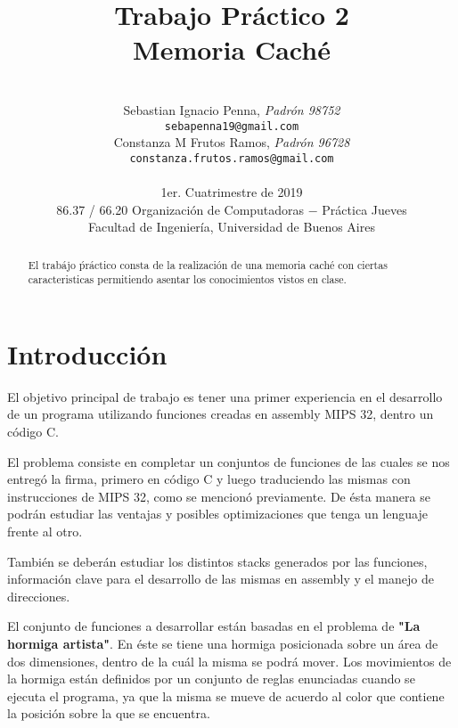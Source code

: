 \documentclass[a4paper, 10pt, twoside, notitlepage]{article}
\title{\textbf{Trabajo Práctico 2\\Memoria Caché} \\}
\author{ \\
         Sebastian Ignacio Penna, \textit{Padrón 98752} \\
          \texttt{ sebapenna19@gmail.com }       \\
		  [2.5ex]
         Constanza M Frutos Ramos, \textit{Padrón 96728}     \\
          \texttt{constanza.frutos.ramos@gmail.com}                      \\ 
		  [2.5ex]
		 \\
         \normalsize{1er. Cuatrimestre de 2019}            \\
         \normalsize{86.37 / 66.20 Organización de Computadoras $-$ Práctica Jueves} \\
         \normalsize{Facultad de Ingeniería, Universidad de Buenos Aires} 
       }
\date{}
\begin{document}
\maketitle


\begin{abstract}
El trabájo ṕráctico consta de la realización de una memoria caché con ciertas caracteristicas permitiendo asentar los conocimientos vistos en clase. 
\end{abstract}

% 
\newpage
% 

\pagestyle{fancy}
\fancyhead{}
\fancyfoot{}
\renewcommand{\sectionmark}[1]{\markright{\thesection\ #1}}
\renewcommand{\headrulewidth}{0.4pt}
\fancyhead[LE]{\nouppercase \rightmark}
\fancyhead[RE, LO]{\bf \thepage}
\fancyhead[RO]{\nouppercase \rightmark}
\fancyfoot[C]{ }
\maketitle
\setcounter{page}{1}
\tableofcontents
\newpage

\parskip 7.2pt
\section{Introducción}
El objetivo principal de trabajo es tener una primer experiencia en el desarrollo de un programa utilizando funciones creadas en assembly MIPS 32, dentro un código C.

El problema consiste en completar un conjuntos de funciones de las cuales se nos entregó la firma, primero en código C y luego traduciendo las mismas con instrucciones de MIPS 32, como se mencionó previamente. De ésta manera se podrán estudiar las ventajas y posibles optimizaciones que tenga un lenguaje frente al otro.

También se deberán estudiar los distintos stacks generados por las funciones, información clave para el desarrollo de las mismas en assembly y el manejo de direcciones.

El conjunto de funciones a desarrollar están basadas en el problema de \textbf{"La hormiga artista"}. En éste se tiene una hormiga posicionada sobre un área de dos dimensiones, dentro de la cuál la misma se podrá mover. Los movimientos de la hormiga están definidos por un conjunto de reglas enunciadas cuando se ejecuta el programa, ya que la misma se mueve de acuerdo al color que contiene la posición sobre la que se encuentra. 
\end{document}
